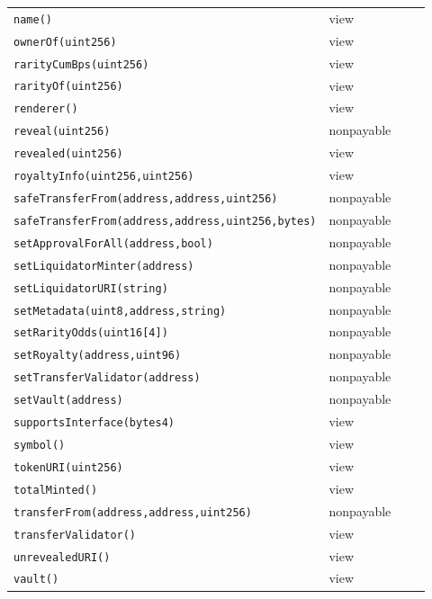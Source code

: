 \begin{longtable}{@{}p{0.62\linewidth}p{0.30\linewidth}@{}}
\texttt{\scriptsize name()} & view \\
\texttt{\scriptsize ownerOf(uint256)} & view \\
\texttt{\scriptsize rarityCumBps(uint256)} & view \\
\texttt{\scriptsize rarityOf(uint256)} & view \\
\texttt{\scriptsize renderer()} & view \\
\texttt{\scriptsize reveal(uint256)} & nonpayable \\
\texttt{\scriptsize revealed(uint256)} & view \\
\texttt{\scriptsize royaltyInfo(uint256,uint256)} & view \\
\texttt{\scriptsize safeTransferFrom(address,address,uint256)} & nonpayable \\
\texttt{\scriptsize safeTransferFrom(address,address,uint256,bytes)} & nonpayable \\
\texttt{\scriptsize setApprovalForAll(address,bool)} & nonpayable \\
\texttt{\scriptsize setLiquidatorMinter(address)} & nonpayable \\
\texttt{\scriptsize setLiquidatorURI(string)} & nonpayable \\
\texttt{\scriptsize setMetadata(uint8,address,string)} & nonpayable \\
\texttt{\scriptsize setRarityOdds(uint16[4])} & nonpayable \\
\texttt{\scriptsize setRoyalty(address,uint96)} & nonpayable \\
\texttt{\scriptsize setTransferValidator(address)} & nonpayable \\
\texttt{\scriptsize setVault(address)} & nonpayable \\
\texttt{\scriptsize supportsInterface(bytes4)} & view \\
\texttt{\scriptsize symbol()} & view \\
\texttt{\scriptsize tokenURI(uint256)} & view \\
\texttt{\scriptsize totalMinted()} & view \\
\texttt{\scriptsize transferFrom(address,address,uint256)} & nonpayable \\
\texttt{\scriptsize transferValidator()} & view \\
\texttt{\scriptsize unrevealedURI()} & view \\
\texttt{\scriptsize vault()} & view \\
\bottomrule\end{longtable}


